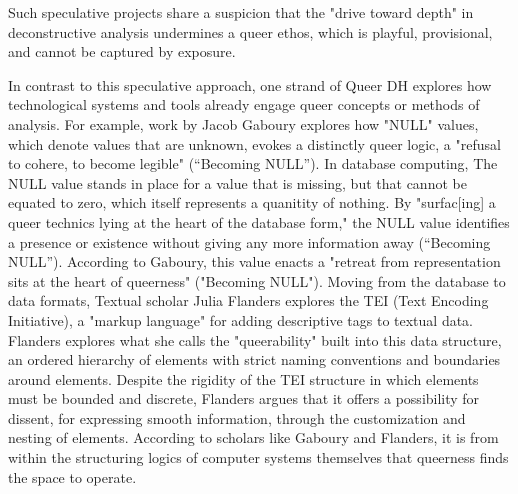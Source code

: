 \documentclass[11pt]{article}
\begin{document}
Such speculative projects share a suspicion that the "drive toward
depth" in deconstructive analysis undermines a queer ethos, which is
playful, provisional, and cannot be captured by exposure.

In contrast to this speculative approach, one strand of Queer DH
explores how technological systems and tools already engage queer
concepts or methods of analysis. For example, work by Jacob Gaboury
explores how "NULL" values, which denote values that are unknown,
evokes a distinctly queer logic, a "refusal to cohere, to become
legible" (“Becoming NULL”). In database computing, The NULL value
stands in place for a value that is missing, but that cannot be
equated to zero, which itself represents a quanitity of nothing. By
"surfac[ing] a queer technics lying at the heart of the database
form," the NULL value identifies a presence or existence without
giving any more information away (“Becoming NULL”). According to
Gaboury, this value enacts a "retreat from representation sits at the
heart of queerness" ("Becoming NULL"). Moving from the database to
data formats, Textual scholar Julia Flanders explores the TEI (Text
Encoding Initiative), a "markup language" for adding descriptive tags
to textual data. Flanders explores what she calls the "queerability"
built into this data structure, an ordered hierarchy of elements with
strict naming conventions and boundaries around elements. Despite the
rigidity of the TEI structure in which elements must be bounded and
discrete, Flanders argues that it offers a possibility for dissent,
for expressing smooth information, through the customization and
nesting of elements. According to scholars like Gaboury and Flanders,
it is from within the structuring logics of computer systems
themselves that queerness finds the space to operate.
\end{document}
